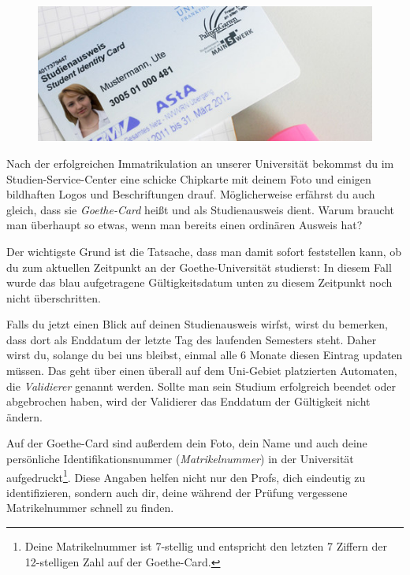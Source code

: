 \begin{figure}
     \vspace{-5mm}
  \begin{center}
     \includegraphics[scale=0.5]{bilder/goethecard}
  \end{center}
\end{figure}

Nach der erfolgreichen Immatrikulation an unserer Universität bekommst du im Studien-Service-Center eine schicke Chipkarte mit deinem Foto und einigen bildhaften Logos und Beschriftungen drauf. Möglicherweise erfährst du auch gleich, dass sie \emph{Goethe-Card} heißt und als Studienausweis dient. Warum braucht man überhaupt so etwas, wenn man bereits einen ordinären Ausweis hat?

Der wichtigste Grund ist die Tatsache, dass man damit sofort feststellen kann, ob du zum aktuellen Zeitpunkt an der Goethe-Universität studierst: In diesem Fall wurde das blau aufgetragene Gültigkeitsdatum unten zu diesem Zeitpunkt noch nicht überschritten. 

Falls du jetzt einen Blick auf deinen Studienausweis wirfst, wirst du bemerken, dass dort als Enddatum der letzte Tag des laufenden Semesters steht. Daher wirst du, solange du bei uns bleibst, einmal alle 6 Monate diesen Eintrag updaten müssen. Das geht über einen überall auf dem Uni-Gebiet platzierten Automaten, die \emph{Validierer} genannt werden. Sollte man sein Studium erfolgreich beendet oder abgebrochen haben, wird der Validierer das Enddatum der Gültigkeit nicht ändern.

Auf der Goethe-Card sind außerdem dein Foto, dein Name und auch deine persönliche Identifikationsnummer (\emph{Matrikelnummer}) in der Universität aufgedruckt\footnote{Deine Matrikelnummer ist 7-stellig und entspricht den letzten 7 Ziffern der 12\hbox{-}stelligen Zahl auf der Goethe-Card.}. Diese Angaben helfen nicht nur den Profs, dich eindeutig zu identifizieren, sondern auch dir, deine während der Prüfung vergessene Matrikelnummer schnell zu finden.

